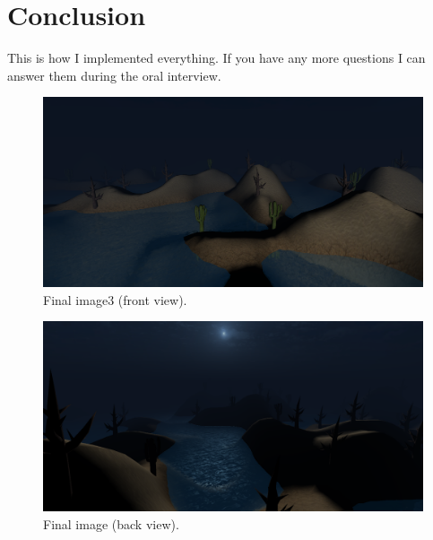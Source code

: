 \newpage

\section{Conclusion}
This is how I implemented everything. If you have any more questions I can answer them during the oral interview.


\begin{figure}[hbt!]
	\centering
	\includegraphics[width= 1
	\textwidth]{images/final1.png}
	\caption{Final image3 (front view).}
\end{figure}


\begin{figure}[hbt!]
	\centering
	\includegraphics[width= 1
	\textwidth]{images/final2.png}
	\caption{Final image (back view).}
\end{figure}
